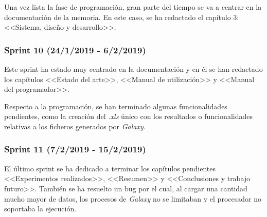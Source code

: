 Una vez lista la fase de programación, gran parte del tiempo se va a centrar en la documentación de la memoria. En este caso, se ha redactado el capítulo 3: <<Sistema, diseño y desarrollo>>.

\subsubsection{Sprint 10 (24/1/2019 - 6/2/2019)}
Este sprint ha estado muy centrado en la documentación y en él se han redactado los capítulos <<Estado del arte>>, <<Manual de utilización>> y <<Manual del programador>>.

Respecto a la programación, se han terminado algunas funcionalidades pendientes, como la creación del \textit{.xls} único con los resultados o funcionalidades relativas a los ficheros generados por \textit{Galaxy}.


\subsubsection{Sprint 11 (7/2/2019 - 15/2/2019)}
El último sprint se ha dedicado a terminar los capítulos pendientes <<Experimentos realizados>>, <<Resumen>> y <<Conclusiones y trabajo futuro>>. También se ha resuelto un bug por el cual, al cargar una cantidad mucho mayor de datos, los procesos de \textit{Galaxy} no se limitaban y el procesador no soportaba la ejecución.